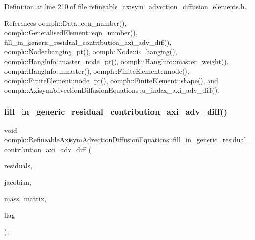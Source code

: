 Definition at line 210 of file refineable\+\_\+axisym\+\_\+advection\+\_\+diffusion\+\_\+elements.\+h.



References oomph\+::\+Data\+::eqn\+\_\+number(), oomph\+::\+Generalised\+Element\+::eqn\+\_\+number(), fill\+\_\+in\+\_\+generic\+\_\+residual\+\_\+contribution\+\_\+axi\+\_\+adv\+\_\+diff(), oomph\+::\+Node\+::hanging\+\_\+pt(), oomph\+::\+Node\+::is\+\_\+hanging(), oomph\+::\+Hang\+Info\+::master\+\_\+node\+\_\+pt(), oomph\+::\+Hang\+Info\+::master\+\_\+weight(), oomph\+::\+Hang\+Info\+::nmaster(), oomph\+::\+Finite\+Element\+::nnode(), oomph\+::\+Finite\+Element\+::node\+\_\+pt(), oomph\+::\+Finite\+Element\+::shape(), and oomph\+::\+Axisym\+Advection\+Diffusion\+Equations\+::u\+\_\+index\+\_\+axi\+\_\+adv\+\_\+diff().

\mbox{\label{classoomph_1_1RefineableAxisymAdvectionDiffusionEquations_aa55874822c3be3ca10bbf4ab908fc844}} 
\subsubsection{\texorpdfstring{fill\+\_\+in\+\_\+generic\+\_\+residual\+\_\+contribution\+\_\+axi\+\_\+adv\+\_\+diff()}{fill\_in\_generic\_residual\_contribution\_axi\_adv\_diff()}}
{\footnotesize\ttfamily void oomph\+::\+Refineable\+Axisym\+Advection\+Diffusion\+Equations\+::fill\+\_\+in\+\_\+generic\+\_\+residual\+\_\+contribution\+\_\+axi\+\_\+adv\+\_\+diff (\begin{DoxyParamCaption}\item[{\hyperlink{classoomph_1_1Vector}{Vector}$<$ double $>$ \&}]{residuals,  }\item[{\hyperlink{classoomph_1_1DenseMatrix}{Dense\+Matrix}$<$ double $>$ \&}]{jacobian,  }\item[{\hyperlink{classoomph_1_1DenseMatrix}{Dense\+Matrix}$<$ double $>$ \&}]{mass\+\_\+matrix,  }\item[{unsigned}]{flag }\end{DoxyParamCaption})\hspace{0.3cm}{\ttfamily [protected]}, {\ttfamily [virtual]}}




